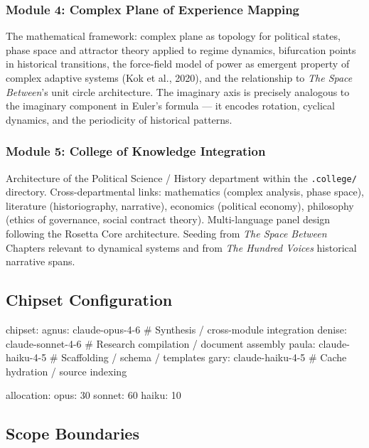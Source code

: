 \documentclass[11pt,letterpaper]{article}
\begin{document}
\subsubsection{Module 4: Complex Plane of Experience Mapping}
The mathematical framework: complex plane as topology for political states, phase space and attractor theory applied to regime dynamics, bifurcation points in historical transitions, the force-field model of power as emergent property of complex adaptive systems (Kok et al., 2020), and the relationship to \textit{The Space Between}'s unit circle architecture. The imaginary axis is precisely analogous to the imaginary component in Euler's formula --- it encodes rotation, cyclical dynamics, and the periodicity of historical patterns.

\subsubsection{Module 5: College of Knowledge Integration}
Architecture of the Political Science / History department within the \texttt{.college/} directory. Cross-departmental links: mathematics (complex analysis, phase space), literature (historiography, narrative), economics (political economy), philosophy (ethics of governance, social contract theory). Multi-language panel design following the Rosetta Core architecture. Seeding from \textit{The Space Between} Chapters relevant to dynamical systems and from \textit{The Hundred Voices} historical narrative spans.

\subsection{Chipset Configuration}

\begin{asciibox}
chipset:
  agnus: claude-opus-4-6     # Synthesis / cross-module integration
  denise: claude-sonnet-4-6  # Research compilation / document assembly
  paula: claude-haiku-4-5    # Scaffolding / schema / templates
  gary: claude-haiku-4-5     # Cache hydration / source indexing

allocation:
  opus:   30%
  sonnet: 60%
  haiku:  10%
\end{asciibox}

\subsection{Scope Boundaries}
\end{document}
